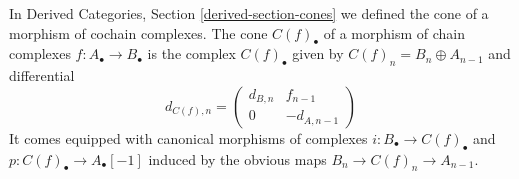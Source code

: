 \noindent
In
Derived Categories, Section \ref{derived-section-cones}
we defined the cone of a morphism of cochain complexes.
The cone $C(f)_\bullet$ of a morphism of chain complexes
$f : A_\bullet \to B_\bullet$ is the complex $C(f)_\bullet$ given by
$C(f)_n = B_n \oplus A_{n - 1}$ and differential
\begin{equation}
\label{equation-differential-cone}
d_{C(f), n} =
\left(
\begin{matrix}
d_{B, n} & f_{n - 1} \\
0 & -d_{A, n - 1}
\end{matrix}
\right)
\end{equation}
It comes equipped with canonical morphisms of complexes
$i : B_\bullet \to C(f)_\bullet$ and
$p : C(f)_\bullet \to A_\bullet[-1]$
induced by the obvious maps $B_n \to C(f)_n \to A_{n - 1}$.
